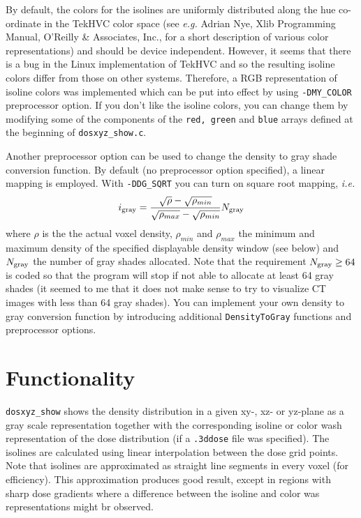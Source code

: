 \documentclass[12pt]{article}
\begin{document}
By default, the colors for the isolines are uniformly distributed
along the hue co-ordinate in the TekHVC color space (see
{\em e.g.} Adrian Nye, Xlib Programming Manual, O'Reilly \& Associates, Inc.,
for a short description of various color representations) and
should be device independent. However, it seems that there
is a bug in the Linux implementation of TekHVC and so
the resulting isoline colors differ from those on other systems.
Therefore, a RGB representation of isoline colors was
implemented which can be put into effect by
using {\tt -DMY\_COLOR} preprocessor option. If you
don't like the isoline colors, you can change them by
modifying some of the components of the {\tt red, green} and {\tt blue}
arrays defined at the beginning of {\tt dosxyz\_show.c}.

Another preprocessor option can be used to change the
density to gray shade conversion function. By default
(no preprocessor option specified), a linear mapping
is employed. With {\tt -DDG\_SQRT} you can turn on
square root mapping, {\em i.e.}
\begin{displaymath}
i_{\rm gray} = {\sqrt{\rho} - \sqrt{\rho_{min}} \over
\sqrt{\rho_{max}} - \sqrt{\rho_{min}}} N_{\rm gray}
\end{displaymath}
where $\rho$ is the the actual voxel density, $\rho_{min}$ and
$\rho_{max}$ the minimum and maximum density of the specified
displayable density window (see below) and $N_{\rm gray}$ the
number of gray shades allocated. Note that the
requirement $N_{\rm gray} \ge 64$ is coded so that
the program will stop if not able to allocate at least
64 gray shades (it seemed to me that it does not make sense
to try to visualize CT images with less than 64 gray shades).
You can implement your own density to gray conversion
function by introducing additional {\tt DensityToGray}
functions and preprocessor options.

\section{\sffamily Functionality}

{\tt dosxyz\_show} shows the density distribution
in a given xy-, xz- or yz-plane as a gray scale representation
together with the corresponding isoline or
color wash representation of the dose distribution
(if a {\tt .3ddose} file was specified). The isolines are
calculated using linear interpolation between the dose grid points.
Note that isolines are approximated as straight line segments in
every voxel (for efficiency). This approximation
produces good result, except in regions with sharp dose gradients
where a difference between the isoline and color was representations
might br observed.
\end{document}
